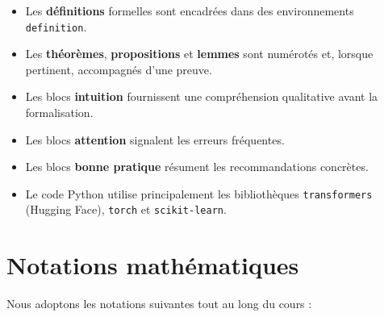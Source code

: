 \begin{itemize}
    \item Les \textbf{d\'efinitions} formelles sont encadr\'ees dans des
          environnements \texttt{definition}.
    \item Les \textbf{th\'eor\`emes}, \textbf{propositions} et \textbf{lemmes}
          sont num\'erot\'es et, lorsque pertinent, accompagn\'es d'une preuve.
    \item Les blocs \textbf{intuition} fournissent une compr\'ehension
          qualitative avant la formalisation.
    \item Les blocs \textbf{attention} signalent les erreurs fr\'equentes.
    \item Les blocs \textbf{bonne pratique} r\'esument les recommandations
          concr\`etes.
    \item Le code Python utilise principalement les biblioth\`eques
          \texttt{transformers} (Hugging Face), \texttt{torch} et
          \texttt{scikit-learn}.
\end{itemize}

\section*{Notations math\'ematiques}

Nous adoptons les notations suivantes tout au long du cours :

